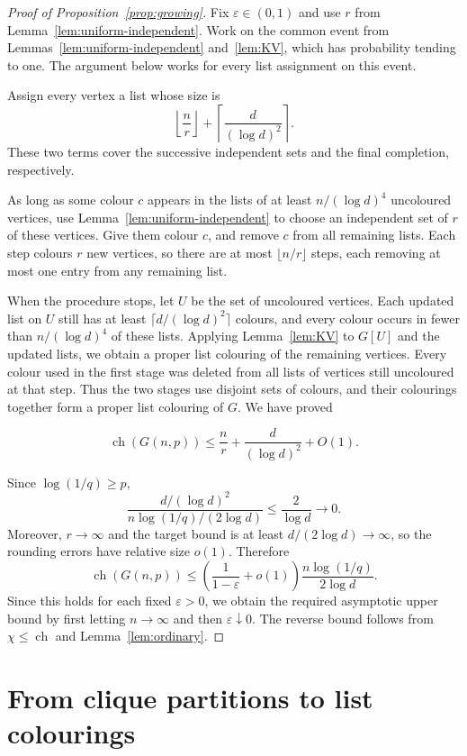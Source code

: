 \documentclass[11pt]{article}
\numberwithin{equation}{section}
\newcommand{\ch}{\operatorname{ch}}
\begin{document}
\begin{proof}[Proof of Proposition~\ref{prop:growing}]
Fix $\varepsilon\in(0,1)$ and use $r$ from Lemma~\ref{lem:uniform-independent}. Work on the common event from Lemmas~\ref{lem:uniform-independent} and~\ref{lem:KV}, which has probability tending to one. The argument below works for every list assignment on this event.

Assign every vertex a list whose size is
\[
 \left\lfloor\frac nr\right\rfloor
 +\left\lceil\frac{d}{(\log d)^2}\right\rceil.
\]
These two terms cover the successive independent sets and the final completion, respectively.

As long as some colour $c$ appears in the lists of at least $n/(\log d)^4$ uncoloured vertices, use Lemma~\ref{lem:uniform-independent} to choose an independent set of $r$ of these vertices. Give them colour $c$, and remove $c$ from all remaining lists. Each step colours $r$ new vertices, so there are at most $\lfloor n/r\rfloor$ steps, each removing at most one entry from any remaining list.

  
When the procedure stops, let $U$ be the set of uncoloured vertices. Each updated list on $U$ still has at least $\lceil d/(\log d)^2\rceil$ colours, and every colour occurs in fewer than $n/(\log d)^4$ of these lists. Applying Lemma~\ref{lem:KV} to $G[U]$ and the updated lists, we obtain a proper list colouring of the remaining vertices. Every colour used in the first stage was deleted from all lists of vertices still uncoloured at that step. Thus the two stages use disjoint sets of colours, and their colourings together form a proper list colouring of $G$. We have proved
 
\[
 \ch(G(n,p))\le\frac nr+\frac{d}{(\log d)^2}+O(1).
\]

Since $\log(1/q)\ge p$,
\[
 \frac{d/(\log d)^2}{n\log(1/q)/(2\log d)}
 \le\frac{2}{\log d}\longrightarrow0.
\]
Moreover, $r\to\infty$ and the target bound is at least $d/(2\log d)\to\infty$, so the rounding errors have relative size $o(1)$. Therefore
\[
 \ch(G(n,p))
 \le\left(\frac{1}{1-\varepsilon}+o(1)\right)
   \frac{n\log(1/q)}{2\log d}.
\]
Since this holds for each fixed $\varepsilon>0$, we obtain the required asymptotic upper bound by first letting $n\to\infty$ and then $\varepsilon\downarrow0$. The reverse bound follows from $\chi\le\ch$ and Lemma~\ref{lem:ordinary}.
\end{proof}

\section{From clique partitions to list colourings}\label{sec:lifting}
\end{document}
